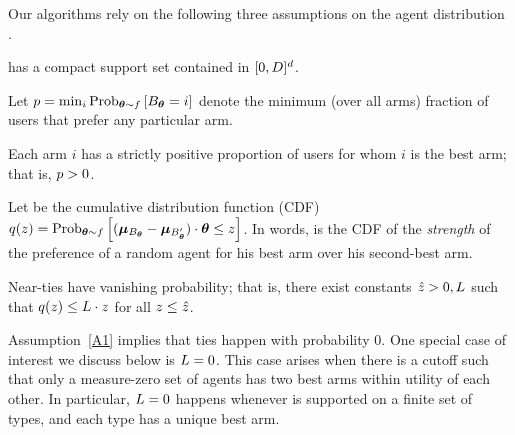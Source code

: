 Our algorithms rely on the following three assumptions on the agent distribution
\AgentDist.

\begin{assumption} \label{A2}
\AgentDist has a compact support set contained in $[0,D]^d$.
\end{assumption}

Let $\MinProb = \min_{i} \Prob[\AgV \sim \AgentDist]{\Best{\AgV} = i}$
denote the minimum (over all arms) fraction of users that prefer any
particular arm.

\begin{assumption} \label{A3}
Each arm $i$ has a strictly positive proportion of users for whom $i$
is the best arm; that is, $p > 0$.
\end{assumption}



Let  be the cumulative distribution function (CDF)
$\AlmostTied{z} = \Prob[\AgV \sim \AgentDist]{%
  (\ArmV{\Best{\AgV}}-\ArmV{\Second{\AgV}}) \cdot \AgV \leq z}$.
In words,  is the CDF of the \emph{strength} of the
preference of a random agent for his best arm over his second-best arm.

\begin{assumption} \label{A1}
Near-ties have vanishing probability; 
that is, there exist constants $\hat{z} > 0, L$ such that 
$q(z) \leq L \cdot z$ for all $z \leq \hat{z}$.
\end{assumption}

Assumption~\ref{A1} implies that ties happen with probability $0$.
One special case of interest we discuss below is $L = 0$.
This case arises when there is a cutoff
\TieCutoff such that only a measure-zero set of agents has two best arms
within utility \TieCutoff of each other.
In particular, $L = 0$ happens whenever \AgentDist is supported on a finite set of types,
and each type has a unique best arm.

